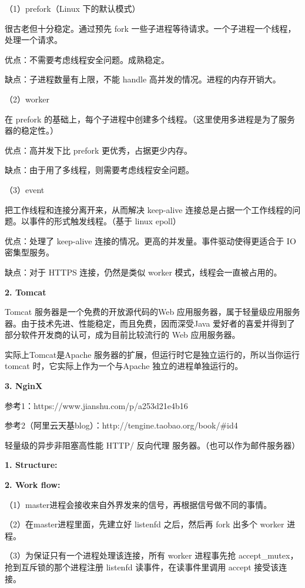 （1）prefork（\+Linux 下的默认模式）

很古老但十分稳定。通过预先 fork 一些子进程等待请求。一个子进程一个线程，处理一个请求。

优点：不需要考虑线程安全问题。成熟稳定。

缺点：子进程数量有上限，不能 handle 高并发的情况。进程的内存开销大。

（2）worker

在 prefork 的基础上，每个子进程中创建多个线程。（这里使用多进程是为了服务器的稳定性。）

优点：高并发下比 prefork 更优秀，占据更少内存。

缺点：由于用了多线程，则需要考虑线程安全问题。

（3）event

把工作线程和连接分离开来，从而解决 keep-\/alive 连接总是占据一个工作线程的问题。以事件的形式触发线程。（基于 linux epoll）

优点：处理了 keep-\/alive 连接的情况。更高的并发量。事件驱动使得更适合于 IO 密集型服务。

缺点：对于 H\+T\+T\+PS 连接，仍然是类似 worker 模式，线程会一直被占用的。

{\bfseries 2. Tomcat}

Tomcat 服务器是一个免费的开放源代码的\+Web 应用服务器，属于轻量级应用服务器。由于技术先进、性能稳定，而且免费，因而深受\+Java 爱好者的喜爱并得到了部分软件开发商的认可，成为目前比较流行的 Web 应用服务器。

实际上\+Tomcat是\+Apache 服务器的扩展，但运行时它是独立运行的，所以当你运行tomcat 时，它实际上作为一个与\+Apache 独立的进程单独运行的。



{\bfseries 3. NginX}

参考1：https\+://www.jianshu.\+com/p/a253d21e4b16

参考2（阿里云天基blog）：http\+://tengine.taobao.\+org/book/\#id4

轻量级的异步非阻塞高性能 H\+T\+T\+P/ 反向代理 服务器。（也可以作为邮件服务器）

{\bfseries 1. Structure\+:}



{\bfseries 2. Work flow\+:}

（1）master进程会接收来自外界发来的信号，再根据信号做不同的事情。

（2）在master进程里面，先建立好 listenfd 之后，然后再 fork 出多个 worker 进程。

（3）为保证只有一个进程处理该连接，所有 worker 进程事先抢 accept\+\_\+mutex，抢到互斥锁的那个进程注册 listenfd 读事件，在读事件里调用 accept 接受该连接。

